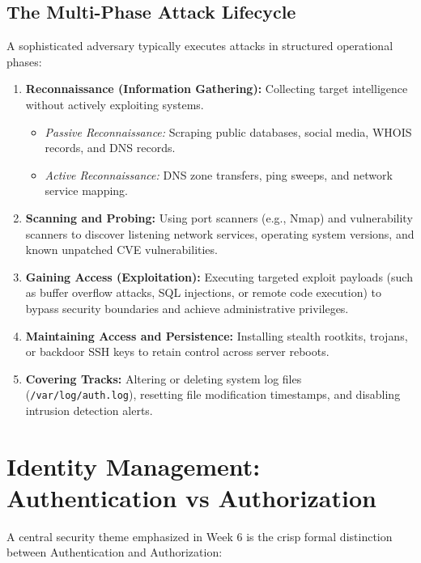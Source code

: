\documentclass[11pt,a4paper,openany]{report}
\begin{document}
\subsection{The Multi-Phase Attack Lifecycle}
A sophisticated adversary typically executes attacks in structured operational phases:
\begin{enumerate}[leftmargin=*]
  \item \textbf{Reconnaissance (Information Gathering):} Collecting target intelligence without actively exploiting systems.
    \begin{itemize}
      \item \emph{Passive Reconnaissance:} Scraping public databases, social media, WHOIS records, and DNS records.
      \item \emph{Active Reconnaissance:} DNS zone transfers, ping sweeps, and network service mapping.
    \end{itemize}
  \item \textbf{Scanning and Probing:} Using port scanners (e.g., Nmap) and vulnerability scanners to discover listening network services, operating system versions, and known unpatched CVE vulnerabilities.
  \item \textbf{Gaining Access (Exploitation):} Executing targeted exploit payloads (such as buffer overflow attacks, SQL injections, or remote code execution) to bypass security boundaries and achieve administrative privileges.
  \item \textbf{Maintaining Access and Persistence:} Installing stealth rootkits, trojans, or backdoor SSH keys to retain control across server reboots.
  \item \textbf{Covering Tracks:} Altering or deleting system log files (\texttt{/var/log/auth.log}), resetting file modification timestamps, and disabling intrusion detection alerts.
\end{enumerate}

\section{Identity Management: Authentication vs Authorization}
A central security theme emphasized in Week 6 is the crisp formal distinction between Authentication and Authorization:
\end{document}
